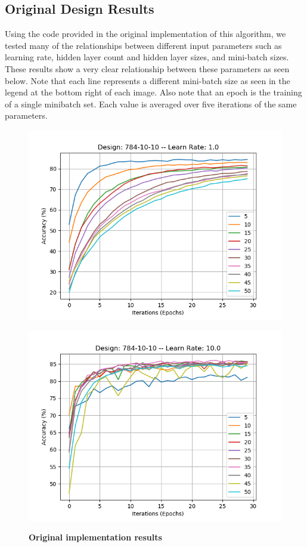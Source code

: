 \documentclass[12pt]{article}
\theoremstyle{definition}
\theoremstyle{plain}
\begin{document}
\subsection{Original Design Results}
Using the code provided in the original implementation of this algorithm\cite{nielsen_2017}, we tested many of the relationships between different input parameters such as learning rate, hidden layer count and hidden layer sizes, and mini-batch sizes. These results show a very clear relationship between these parameters as seen below. Note that each line represents a different mini-batch size as seen in the legend at the bottom right of each image. Also note that an epoch is the training of a single minibatch set. Each value is averaged over five iterations of the same parameters. 
\begin{figure}
	\begin{minipage}{\linewidth}
	\centering\captionsetup[subfigure]{justification=centering}
	\includegraphics[width=\textwidth]{Images/Original/lr1.png}
	\subcaption{}
	\label{fig:LR1}\par\vfill
	\includegraphics[width=\textwidth]{Images/Original/lr10.png}
	\subcaption{}
	\label{fig:LR10}\par\vfill
	\end{minipage}
\caption{\textbf{Original implementation results}}\label{fig:original}
\end{figure}
\end{document}
